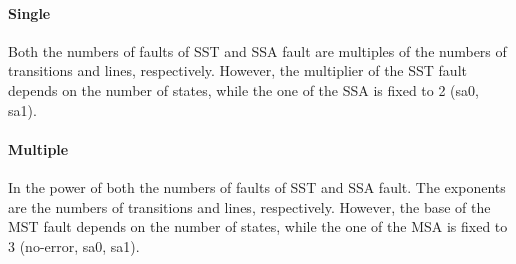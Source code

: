 \paragraph{Single}
Both the numbers of faults of SST and SSA fault are multiples of the numbers of transitions and lines, respectively. However, the multiplier of the SST fault depends on the number of states, while the one of the SSA is fixed to 2 (sa0, sa1).
\paragraph{Multiple}
In the power of both the numbers of faults of SST and SSA fault. The exponents are the numbers of transitions and lines, respectively. However, the base of the MST fault depends on the number of states, while the one of the MSA is fixed to 3 (no-error, sa0, sa1).
